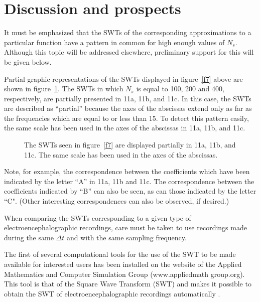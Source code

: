 \documentclass[11pt]{rMTA2010} \usepackage[utf8]{inputenc} \usepackage{graphicx} \usepackage{booktabs} \usepackage{array} \usepackage{enumerate}
\begin{document}
\vspace{4mm}



\section{Discussion and prospects}

It must be emphasized that the SWTs of the corresponding approximations to a particular function have a pattern in common for high enough values of $N_s$. Although this topic will be addressed elsewhere, preliminary support for this will be given below.

Partial graphic representations of the SWTs displayed in figure~\ref{f7} above are shown in figure~\ref{f10}. The SWTs in which $N_s$ is equal to 100, 200 and 400, respectively, are partially presented in 11a, 11b, and 11c. In this case, the SWTs are described as ``partial'' because the axes of the abscissas extend only as far as the frequencies which are equal to or less than 15. To detect this pattern easily, the same scale has been used in the axes of the abscissas in 11a, 11b, and 11c.

\begin{figure}[H]
\centering
{}\qquad
\caption[]{}
\end{figure}
\begin{figure}[H]
\ContinuedFloat
{}\qquad
{}\qquad
\caption{The SWTs seen in figure~\ref{f7} are displayed partially in 11a, 11b, and 11c. The same scale has been used in the axes of the abscissas.}
\label{f10}
\end{figure}

Note, for example, the correspondence between the coefficients which have been indicated by the letter ``A'' in 11a, 11b and 11c. The correspondence between the coefficients indicated by ``B'' can also be seen, as can those indicated by the letter ``C". (Other interesting correspondences can also be observed, if desired.)

When comparing the SWTs corresponding to a given type of electroencephalographic recordings, care must be taken to use recordings made during the same $\Delta t$ and with the same sampling frequency.

The first of several computational tools for the use of the SWT to be made available for interested users has been installed on the website of the Applied Mathematics and Computer Simulation Group (www.appliedmath group.org). This tool is that of the Square Wave Transform (SWT) and makes it possible to obtain the SWT of electroencephalographic recordings automatically \cite{b6}.
\end{document}
